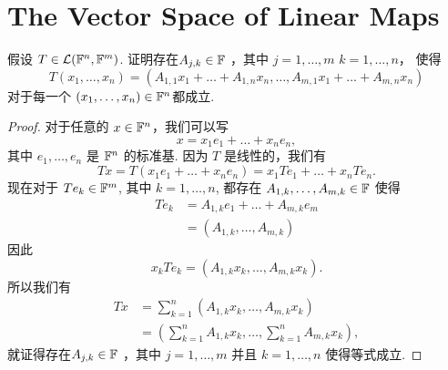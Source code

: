 \section{The Vector Space of Linear Maps}

\begin{problem}{3}
  假设 $T\in \mathcal{L}(\mathbb{F}^n,\mathbb{F}^m)$.  
  证明存在$A_{j,k}\in\mathbb{F}$ ，其中 $j=1,\dots,m$
   $k=1,\dots,n$， 使得
  \begin{equation*}
  T(x_1,\dots,x_n) = (A_{1,1}x_1 + \dots + A_{1,n}x_n,\dots, A_{m,1}x_1 + \dots + A_{m,n}x_n)
  \end{equation*}
  对于每一个 $(x_1,\dots,x_n)\in\mathbb{F}^n$都成立.
\end{problem}
\begin{proof}[Proof]
  对于任意的 $x\in\mathbb{F}^n$，我们可以写 
  \begin{equation*}
    x = x_1 e_1 + \dots + x_n e_n,
  \end{equation*}
  其中 $e_1,\dots,e_n$ 是 $\mathbb{F}^n$ 的标准基.  
  因为 $T$ 是线性的，我们有
  \begin{equation*}
    Tx = T(x_1 e_1 + \dots +x_n e_n) = x_1 Te_1 + \dots + x_n Te_n.
  \end{equation*}
  现在对于 $Te_k\in\mathbb{F}^m$, 其中 $k=1,\dots, n$, 都存在 
  $A_{1,k},\dots, A_{m,k}\in\mathbb{F}$ 使得
  \begin{align*}
    Te_k &= A_{1,k}e_1 + \dots + A_{m,k}e_m\\
        &= \left(A_{1,k}, \dots, A_{m,k}\right)
  \end{align*}
  因此
  \begin{equation*}
    x_kTe_k = \left(A_{1,k}x_k, \dots, A_{m,k}x_k\right).
  \end{equation*}
  所以我们有
  \begin{align*}
    Tx &= \sum_{k = 1}^n \left(A_{1,k}x_k, \dots, A_{m,k}x_k\right)\\
       &= \left(\sum_{k = 1}^nA_{1,k}x_k, \dots, \sum_{k = 1}^nA_{m,k}x_k \right),
  \end{align*}
  就证得存在$A_{j,k}\in\mathbb{F}$ ，其中 $j=1,\dots,m$ 并且 $k=1,\dots,n$ 使得等式成立.
\end{proof}
